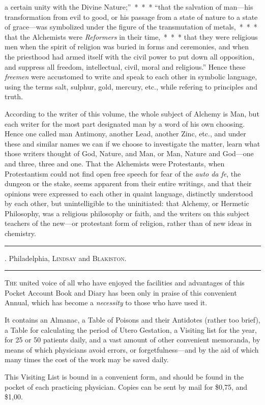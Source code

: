 a certain unity with the Divine Nature;''~*~*~* ``that the salvation
of man---his transformation from evil to good, or his passage from
a state of nature to a state of grace---was symbolized under the figure
of the transmutation of metals,~*~*~* that the Alchemists were
\emph{Reformers} in their time,~*~*~* that they were religious men when
the spirit of religion was buried in forms and ceremonies, and when
the priesthood had armed itself with the civil power to put down all
opposition, and suppress all freedom, intellectual, civil, moral and religious.''
Hence these \emph{freemen} were accustomed to write and speak
to each other in symbolic language, using the terms salt, sulphur, gold,
mercury, etc., while refering to principles and truth.

According to the writer of this volume, the whole subject of Alchemy
is Man, but each writer for the most part designated man by a word of
his own choosing. Hence one called man Antimony, another Lead,
another Zinc, etc., and under these and similar names we can if we
choose to investigate the matter, learn what those writers thought of
God, Nature, and Man, or Man, Nature and God---one and three, three
and one. That the Alchemists were Protestants, when Protestantism
could not find open free speech for fear of the \emph{auto da fe}, the dungeon
or the stake, seems apparent from their entire writings, and that their
opinions were expressed to each other in quaint language, distinctly
understood by each other, but unintelligible to the uninitiated: that
Alchemy, or Hermetic Philosophy, was a religious philosophy or faith,
and the writers on this subject teachers of the new---or protestant form
of religion, rather than of new ideas in chemistry.

\fancybreak{* * *}

\footnotesize
{}. Philadelphia,
\textsc{Lindsay} and \textsc{Blakiston}.
\plainbreak{1}
\normalsize


\lettrine[lines=1]{}{The} united voice of all who have enjoyed the facilities and advantages
of this Pocket Account Book and Diary has been only in praise
of this convenient Annual, which has become a \emph{necessity} to those who
have used it.

It contains an Almanac, a Table of Poisons and their Antidotes
(rather too brief), a Table for calculating the period of Utero Gestation,
a Visiting list for the year, for 25 or 50 patients daily, and a vast
amount of other convenient memoranda, by means of which physicians
avoid errors, or forgetfulness---and by the aid of which many times
the cost of the work may be saved daily.

This Visiting List is bound in a convenient form, and should be found
in the pocket of each practicing physician. Copies can be sent by mail
for \$0,75, and \$1,00.\endinput

